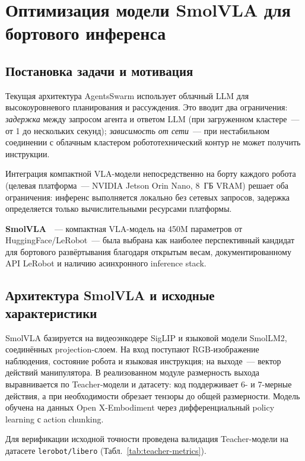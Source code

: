 \documentclass[14pt,a4paper]{extreport}
\begin{document}
\chapter{Оптимизация модели SmolVLA для бортового инференса}

\section{Постановка задачи и мотивация}

Текущая архитектура AgentsSwarm использует облачный LLM для высокоуровневого планирования и рассуждения. Это вводит два ограничения: \textit{задержка} между запросом агента и ответом LLM (при загруженном кластере~--- от 1 до нескольких секунд); \textit{зависимость от сети}~--- при нестабильном соединении с облачным кластером робототехнический контур не может получить инструкции.

Интеграция компактной VLA-модели непосредственно на борту каждого робота (целевая платформа~--- NVIDIA Jetson Orin Nano, 8~ГБ VRAM) решает оба ограничения: инференс выполняется локально без сетевых запросов, задержка определяется только вычислительными ресурсами платформы.

\textbf{SmolVLA}~\cite{retzlaff2025smolvla,smolvla_model,lerobot,lerobot_docs}~--- компактная VLA-модель на 450M параметров от HuggingFace/LeRobot~--- была выбрана как наиболее перспективный кандидат для бортового развёртывания благодаря открытым весам, документированному API LeRobot и наличию асинхронного inference stack.

\section{Архитектура SmolVLA и исходные характеристики}

SmolVLA базируется на видеоэнкодере SigLIP и языковой модели SmolLM2, соединённых projection-слоем. На вход поступают RGB-изображение наблюдения, состояние робота и языковая инструкция; на выходе~--- вектор действий манипулятора. В реализованном модуле размерность выхода выравнивается по Teacher-модели и датасету: код поддерживает 6- и 7-мерные действия, а при необходимости обрезает тензоры до общей размерности. Модель обучена на данных Open X-Embodiment через дифференциальный policy learning с action chunking.

Для верификации исходной точности проведена валидация Teacher-модели на датасете \texttt{lerobot/libero} (Табл.~\ref{tab:teacher-metrics}).
\end{document}

